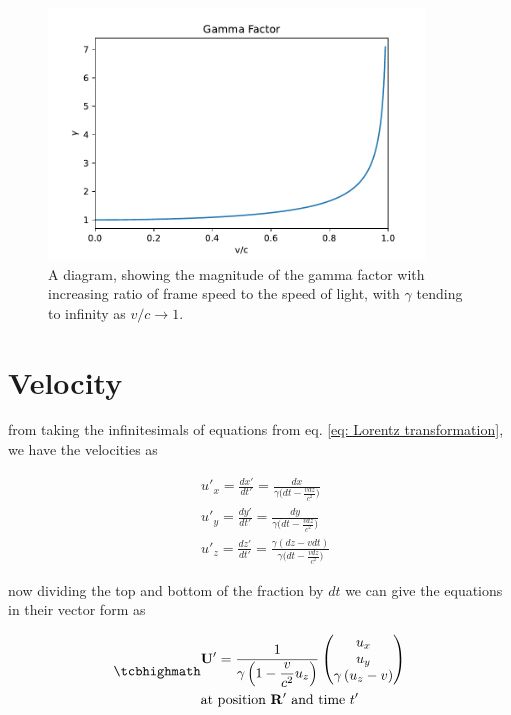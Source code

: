 \begin{figure}[H]
	\centering
	\includegraphics[width=10cm]{images/pdf/Gamma_Factor.pdf}
	\caption{A diagram, showing the magnitude of the gamma factor with increasing ratio of frame speed to the speed of light, with $\gamma$ tending to infinity as $v/c\rightarrow 1$.}
	\label{fig: Gamma Factor}
\end{figure}

\section{Velocity}

from taking the infinitesimals of equations from eq. \eqref{eq: Lorentz transformation}, we have the velocities as

\begin{equation}
	\begin{aligned}
		 & u'_x = \frac{dx'}{dt'}=\frac{dx}{\gamma \bigg(dt-\frac{vdz}{c^2}\bigg) }                \\
		 & u'_y = \frac{dy'}{dt'}=\frac{dy}{\gamma \bigg(dt-\frac{vdz}{c^2}\bigg) }                \\
		 & u'_z = \frac{dz'}{dt'} = \frac{\gamma (dz-vdt)}{\gamma \bigg(dt-\frac{vdz}{c^2}\bigg) }
	\end{aligned}
\end{equation}

now dividing the top and bottom of the fraction by $dt$ we can give the equations in their vector form as

\begin{equation}
	\label{eq: velocity transform}
	\mhl{
		\begin{aligned}
			 & \mathbf{U}' = \dfrac{1}{\gamma\left(1- \dfrac{v}{c^2} u_z\right) }
			\begin{pmatrix}
				u_x                           \\
				u_y                           \\
				\gamma \left( u_z - v \right) \\
			\end{pmatrix}
			\\
			 & \text{at position $\mathbf{R}'$ and time $t'$ }
		\end{aligned}
	}
\end{equation}

